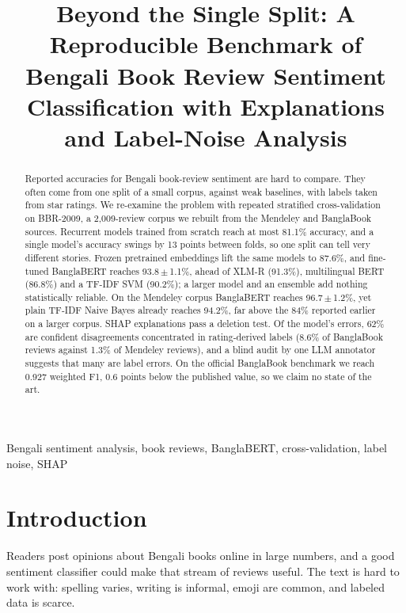 \documentclass[conference,a4paper]{IEEEtran}
\newcommand{\pmstd}[2]{#1\,$\pm$\,#2}
\begin{document}
\title{Beyond the Single Split: A Reproducible Benchmark of Bengali Book Review Sentiment Classification with Explanations and Label-Noise Analysis}


\maketitle

\begin{abstract}
Reported accuracies for Bengali book-review sentiment are hard to compare. They often come from one split of a small corpus, against weak baselines, with labels taken from star ratings. We re-examine the problem with repeated stratified cross-validation on BBR-2009, a 2,009-review corpus we rebuilt from the Mendeley and BanglaBook sources. Recurrent models trained from scratch reach at most 81.1\% accuracy, and a single model's accuracy swings by 13 points between folds, so one split can tell very different stories. Frozen pretrained embeddings lift the same models to 87.6\%, and fine-tuned BanglaBERT reaches \pmstd{93.8}{1.1}\%, ahead of XLM-R (91.3\%), multilingual BERT (86.8\%) and a TF-IDF SVM (90.2\%); a larger model and an ensemble add nothing statistically reliable. On the Mendeley corpus BanglaBERT reaches \pmstd{96.7}{1.2}\%, yet plain TF-IDF Naive Bayes already reaches 94.2\%, far above the 84\% reported earlier on a larger corpus. SHAP explanations pass a deletion test. Of the model's errors, 62\% are confident disagreements concentrated in rating-derived labels (8.6\% of BanglaBook reviews against 1.3\% of Mendeley reviews), and a blind audit by one LLM annotator suggests that many are label errors. On the official BanglaBook benchmark we reach 0.927 weighted F1, 0.6 points below the published value, so we claim no state of the art.
\end{abstract}

\begin{IEEEkeywords}
Bengali sentiment analysis, book reviews, BanglaBERT, cross-validation, label noise, SHAP
\end{IEEEkeywords}

\section{Introduction}
Readers post opinions about Bengali books online in large numbers, and a good sentiment classifier could make that stream of reviews useful. The text is hard to work with: spelling varies, writing is informal, emoji are common, and labeled data is scarce.
\end{document}
